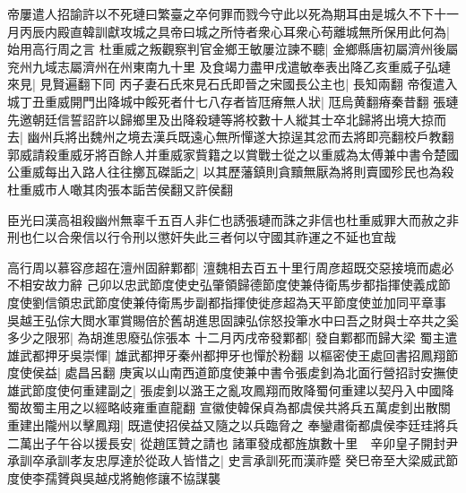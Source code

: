 帝屢遣人招諭許以不死璉曰繁臺之卒何罪而戮今守此以死為期耳由是城久不下十一月丙辰内殿直韓訓獻攻城之具帝曰城之所恃者衆心耳衆心苟離城無所保用此何為|{
	始用高行周之言}
杜重威之叛觀察判官金鄉王敏屢泣諫不聽|{
	金鄉縣唐初屬濟州後屬兖州九域志屬濟州在州東南九十里}
及食竭力盡甲戌遣敏奉表出降乙亥重威子弘璉來見|{
	見賢遍翻下同}
丙子妻石氏來見石氏即晉之宋國長公主也|{
	長知兩翻}
帝復遣入城丁丑重威開門出降城中餒死者什七八存者皆尫瘠無人狀|{
	尫烏黄翻瘠秦昔翻}
張璉先邀朝廷信誓詔許以歸鄉里及出降殺璉等將校數十人縱其士卒北歸將出境大掠而去|{
	幽州兵將出魏州之境去漢兵既遠心無所憚遂大掠逞其忿而去將即亮翻校戶教翻}
郭威請殺重威牙將百餘人并重威家貲籍之以賞戰士從之以重威為太傅兼中書令楚國公重威每出入路人往往擲瓦磔詬之|{
	以其歷藩鎮則貪黷無厭為將則賣國殄民也為殺杜重威市人噉其肉張本詬苦侯翻又許侯翻}


臣光曰漢高祖殺幽州無辜千五百人非仁也誘張璉而誅之非信也杜重威罪大而赦之非刑也仁以合衆信以行令刑以懲奸失此三者何以守國其祚運之不延也宜哉

高行周以慕容彦超在澶州固辭鄴都|{
	澶魏相去百五十里行周彦超既交惡接境而處必不相安故力辭}
己卯以忠武節度使史弘肇領歸德節度使兼侍衛馬步都指揮使義成節度使劉信領忠武節度使兼侍衛馬步副都指揮使徙彦超為天平節度使並加同平章事　吳越王弘倧大閲水軍賞賜倍於舊胡進思固諫弘倧怒投筆水中曰吾之財與士卒共之奚多少之限邪|{
	為胡進思廢弘倧張本}
十二月丙戌帝發鄴都|{
	發自鄴都而歸大梁}
蜀主遣雄武都押牙吳崇惲|{
	雄武都押牙秦州都押牙也憚於粉翻}
以樞密使王處回書招鳳翔節度使侯益|{
	處昌呂翻}
庚寅以山南西道節度使兼中書令張䖍釗為北面行營招討安撫使雄武節度使何重建副之|{
	張䖍釗以潞王之亂攻鳳翔而敗降蜀何重建以契丹入中國降蜀故蜀主用之以經略岐雍重直龍翻}
宣徽使韓保貞為都虞侯共將兵五萬䖍釗出散關重建出隴州以擊鳳翔|{
	既遣使招侯益又隨之以兵臨脅之}
奉鑾肅衛都虞侯李廷珪將兵二萬出子午谷以援長安|{
	從趙匡贊之請也}
諸軍發成都旌旗數十里　辛卯皇子開封尹承訓卒承訓孝友忠厚達於從政人皆惜之|{
	史言承訓死而漢祚蹙}
癸巳帝至大梁威武節度使李孺贇與吳越戍將鮑修讓不協謀襲

